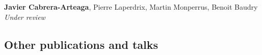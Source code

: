 \begin{enumerate}[label=\subscript{P}{{\arabic*}}]
    {\small\textbf{Javier Cabrera-Arteaga}, Pierre Laperdrix, Martin Monperrus, Benoit Baudry}\\
    \emph{Under review}\\
\end{enumerate}

\subsection*{Other publications and talks}

